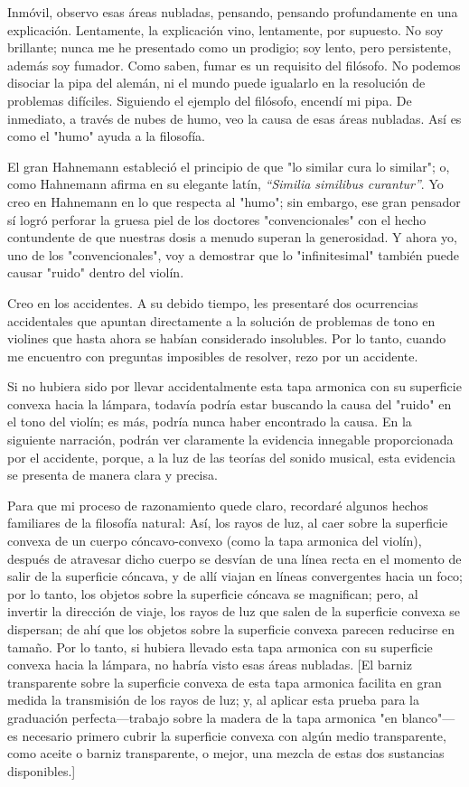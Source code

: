 \documentclass[12pt]{book}
\begin{document}
Inmóvil, observo esas áreas nubladas, pensando, pensando profundamente en una explicación. Lentamente, la explicación vino, lentamente, por supuesto. No soy brillante; nunca me he presentado como un prodigio; soy lento, pero persistente, además soy fumador. Como saben, fumar es un requisito del filósofo. No podemos disociar la pipa del alemán, ni el mundo puede igualarlo en la resolución de problemas difíciles. Siguiendo el ejemplo del filósofo, encendí mi pipa. De inmediato, a través de nubes de humo, veo la causa de esas áreas nubladas. Así es como el "humo" ayuda a la filosofía.

El gran Hahnemann estableció el principio de que "lo similar cura lo similar"; o, como Hahnemann afirma en su elegante latín, \textit{“Similia similibus curantur”}. Yo creo en Hahnemann en lo que respecta al "humo"; sin embargo, ese gran pensador sí logró perforar la gruesa piel de los doctores "convencionales" con el hecho contundente de que nuestras dosis a menudo superan la generosidad. Y ahora yo, uno de los "convencionales", voy a demostrar que lo "infinitesimal" también puede causar "ruido" dentro del violín.

Creo en los accidentes. A su debido tiempo, les presentaré dos ocurrencias accidentales que apuntan directamente a la solución de problemas de tono en violines que hasta ahora se habían considerado insolubles. Por lo tanto, cuando me encuentro con preguntas imposibles de resolver, rezo por un accidente.

Si no hubiera sido por llevar accidentalmente esta tapa armonica con su superficie convexa hacia la lámpara, todavía podría estar buscando la causa del "ruido" en el tono del violín; es más, podría nunca haber encontrado la causa. En la siguiente narración, podrán ver claramente la evidencia innegable proporcionada por el accidente, porque, a la luz de las teorías del sonido musical, esta evidencia se presenta de manera clara y precisa.

Para que mi proceso de razonamiento quede claro, recordaré algunos hechos familiares de la filosofía natural: Así, los rayos de luz, al caer sobre la superficie convexa de un cuerpo cóncavo-convexo (como la tapa armonica del violín), después de atravesar dicho cuerpo se desvían de una línea recta en el momento de salir de la superficie cóncava, y de allí viajan en líneas convergentes hacia un foco; por lo tanto, los objetos sobre la superficie cóncava se magnifican; pero, al invertir la dirección de viaje, los rayos de luz que salen de la superficie convexa se dispersan; de ahí que los objetos sobre la superficie convexa parecen reducirse en tamaño. Por lo tanto, si hubiera llevado esta tapa armonica con su superficie convexa hacia la lámpara, no habría visto esas áreas nubladas. [El barniz transparente sobre la superficie convexa de esta tapa armonica facilita en gran medida la transmisión de los rayos de luz; y, al aplicar esta prueba para la graduación perfecta—trabajo sobre la madera de la tapa armonica "en blanco"—es necesario primero cubrir la superficie convexa con algún medio transparente, como aceite o barniz transparente, o mejor, una mezcla de estas dos sustancias disponibles.]
\end{document}
